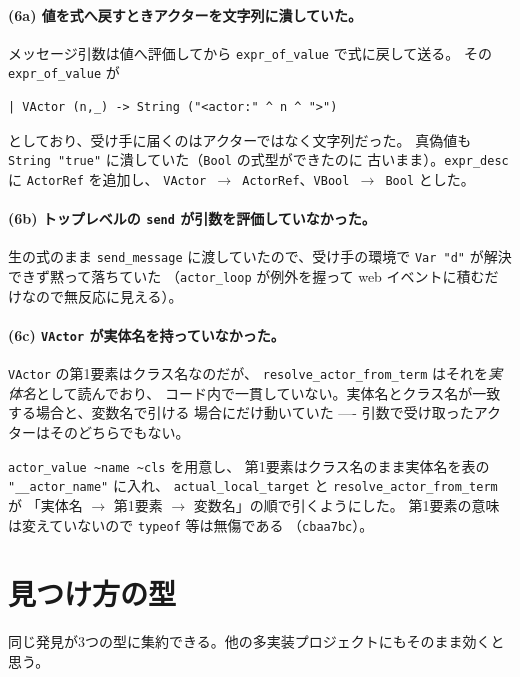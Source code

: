 \documentclass[11pt,a4paper]{ltjsarticle}
\begin{document}
\paragraph{(6a) 値を式へ戻すときアクターを文字列に潰していた。}
メッセージ引数は値へ評価してから \texttt{expr\_of\_value} で式に戻して送る。
その \texttt{expr\_of\_value} が

\begin{lstlisting}[language={[Objective]Caml}]
| VActor (n,_) -> String ("<actor:" ^ n ^ ">")
\end{lstlisting}

\noindent としており、受け手に届くのはアクターではなく文字列だった。
真偽値も \texttt{String "true"} に潰していた（\texttt{Bool} の式型ができたのに
古いまま）。\texttt{expr\_desc} に \texttt{ActorRef} を追加し、
\texttt{VActor $\to$ ActorRef}、\texttt{VBool $\to$ Bool} とした。

\paragraph{(6b) トップレベルの \texttt{send} が引数を評価していなかった。}
生の式のまま \texttt{send\_message} に渡していたので、受け手の環境で
\texttt{Var "d"} が解決できず黙って落ちていた
（\texttt{actor\_loop} が例外を握って web イベントに積むだけなので無反応に見える）。

\paragraph{(6c) \texttt{VActor} が実体名を持っていなかった。}
\texttt{VActor} の第1要素はクラス名なのだが、
\texttt{resolve\_actor\_from\_term} はそれを\emph{実体名}として読んでおり、
コード内で一貫していない。実体名とクラス名が一致する場合と、変数名で引ける
場合にだけ動いていた ---- 引数で受け取ったアクターはそのどちらでもない。

\texttt{actor\_value \textasciitilde name \textasciitilde cls} を用意し、
第1要素はクラス名のまま実体名を表の \texttt{"\_\_actor\_name"} に入れ、
\texttt{actual\_local\_target} と \texttt{resolve\_actor\_from\_term} が
「実体名 $\to$ 第1要素 $\to$ 変数名」の順で引くようにした。
第1要素の意味は変えていないので \texttt{typeof} 等は無傷である
（\texttt{cbaa7bc}）。

\section{見つけ方の型}

同じ発見が3つの型に集約できる。他の多実装プロジェクトにもそのまま効くと思う。
\end{document}
